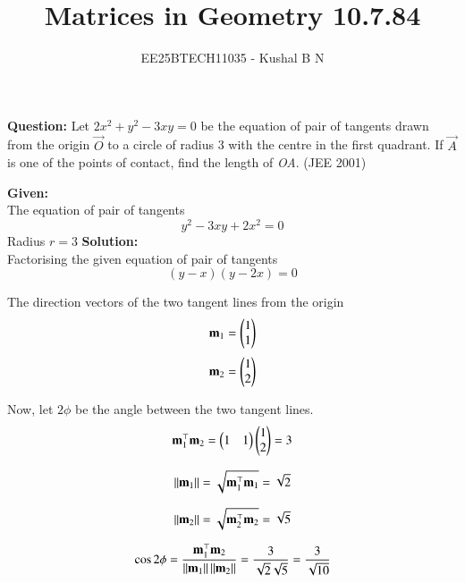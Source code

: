 \documentclass[journal,12pt,onecolumn]{IEEEtran}
\title{Matrices in Geometry 10.7.84}
\author{EE25BTECH11035 - Kushal B N}
\theoremstyle{remark}
\begin{document}
\vspace{3cm}
\maketitle
{\let\newpage\relax\maketitle}
\textbf{Question: }
Let $2x^2 + y^2 - 3xy = 0$ be the equation of pair of tangents drawn from the origin $\vec{O}$ to a circle of radius 3 with the centre in the first quadrant. If $\vec{A}$ is one of the points of contact, find the length of \textit{OA}.
\hfill (JEE 2001)

\textbf{Given: }\\
The equation of pair of tangents
\begin{equation}
    y^2 - 3xy + 2x^2 = 0
\end{equation}
Radius $r = 3$
\textbf{Solution: }\\
Factorising the given equation of pair of tangents
\begin{equation}
    (y-x)(y-2x) = 0
\end{equation}

The direction vectors of the two tangent lines from the origin 
\begin{equation}
    \mathbf{m}_1 = \begin{pmatrix}1\\1\end{pmatrix}
\end{equation}
\begin{equation}
    \mathbf{m}_2 = \begin{pmatrix}1\\2\end{pmatrix}
\end{equation}

Now, let $2\phi$ be the angle between the two tangent lines.
\begin{equation}
    \mathbf{m}_1^{\top}\mathbf{m}_2 = \begin{pmatrix}1&1\end{pmatrix}\begin{pmatrix}1\\2\end{pmatrix} = 3
\end{equation}

\begin{equation}
    \left\lVert\mathbf{m}_1\right\rVert = \sqrt{\mathbf{m}_1^{\top}\mathbf{m}_1} = \sqrt{2}
\end{equation}

\begin{equation}
    \left\lVert\mathbf{m}_2\right\rVert = \sqrt{\mathbf{m}_2^{\top}\mathbf{m}_2} = \sqrt{5}
\end{equation}

\begin{equation}
    \cos{2\phi} = \frac{\mathbf{m}_1^{\top}\mathbf{m}_2}{\left\lVert\mathbf{m}_1\right\rVert\left\lVert\mathbf{m}_2\right\rVert} = \frac{3}{\sqrt{2}\sqrt{5}} = \frac{3}{\sqrt{10}}
\end{equation}
\end{document}
